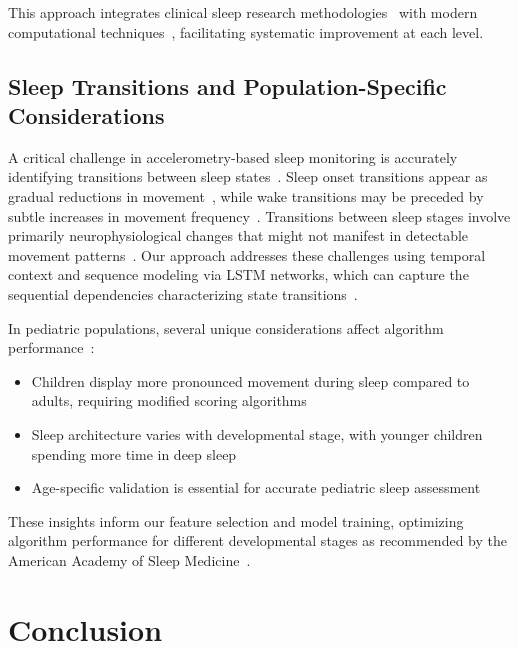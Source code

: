 \documentclass[conference]{IEEEtran}
\begin{document}
This approach integrates clinical sleep research methodologies~\cite{aasm2007, littner2003} with modern computational techniques~\cite{zhang2020machine, behar2013}, facilitating systematic improvement at each level.

\subsection{Sleep Transitions and Population-Specific Considerations}

A critical challenge in accelerometry-based sleep monitoring is accurately identifying transitions between sleep states~\cite{aasm2015, littner2003}. Sleep onset transitions appear as gradual reductions in movement~\cite{sadeh1994activity}, while wake transitions may be preceded by subtle increases in movement frequency~\cite{kushida2001}. Transitions between sleep stages involve primarily neurophysiological changes that might not manifest in detectable movement patterns~\cite{rechtschaffen1968, sadeh2011}. Our approach addresses these challenges using temporal context and sequence modeling via LSTM networks, which can capture the sequential dependencies characterizing state transitions~\cite{borbely1982}.

In pediatric populations, several unique considerations affect algorithm performance~\cite{arXiv2023, acebo2006}:

\begin{itemize}
	\item Children display more pronounced movement during sleep compared to adults, requiring modified scoring algorithms~\cite{sadeh2011, acebo2006}
	\item Sleep architecture varies with developmental stage, with younger children spending more time in deep sleep~\cite{rechtschaffen1968, aasm2007}
	\item Age-specific validation is essential for accurate pediatric sleep assessment~\cite{sadeh2011}
\end{itemize}

These insights inform our feature selection and model training, optimizing algorithm performance for different developmental stages as recommended by the American Academy of Sleep Medicine~\cite{littner2003, sadeh2011}.

\section{Conclusion}

\end{document}
